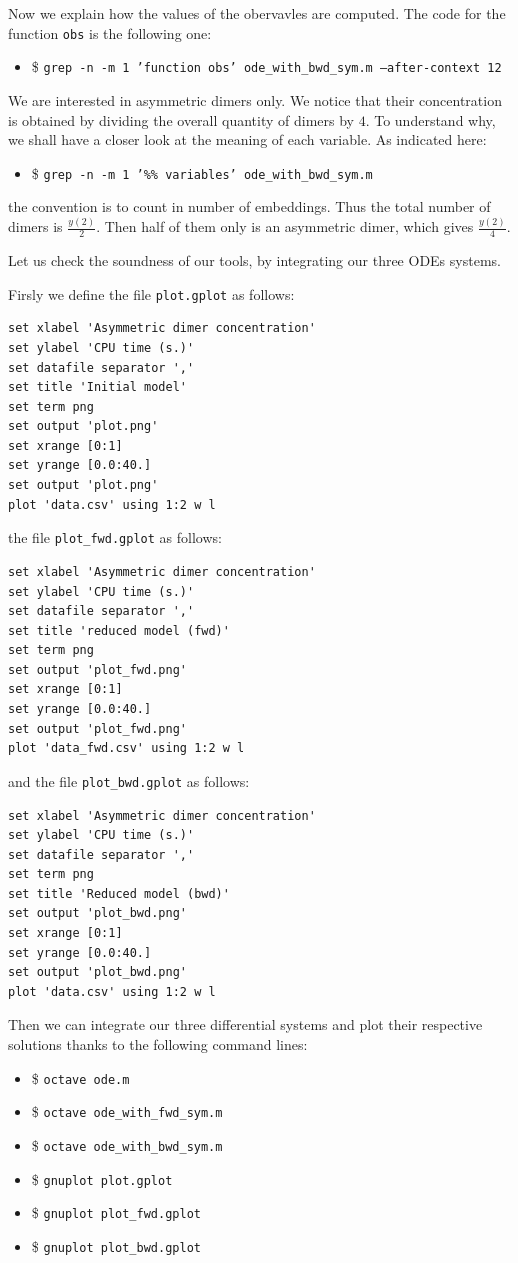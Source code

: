 \documentclass[11pt]{book}
\def\ttt#1{\texttt{#1}}
\def\ITE#1{\begin{itemize}#1\end{itemize}}
\begin{document}
Now we explain how the values of the obervavles are computed.
The code for the function \texttt{obs} is the following one:
\ITE{
\item[\$] \ttt{grep -n -m 1 'function obs' ode\_with\_bwd\_sym.m --after-context 12}}

 We are interested in asymmetric dimers only. We notice that their concentration is obtained by dividing the overall quantity of dimers by $4$. To understand why, we shall have a closer look at the meaning of each variable. As indicated here:
\ITE{
\item[\$] \ttt{grep -n -m 1 '\%\% variables' ode\_with\_bwd\_sym.m}}

the convention is to count in number of embeddings. Thus the total number of dimers is $\frac{y(2)}{2}$. Then half of them only is an asymmetric dimer, which gives $\frac{y(2)}{4}$.

Let us check the soundness of our tools, by integrating our three  ODEs systems.

Firsly we define the file \texttt{plot.gplot} as follows:
\begin{lstlisting}[language=Gnuplot]
set xlabel 'Asymmetric dimer concentration'
set ylabel 'CPU time (s.)'
set datafile separator ','
set title 'Initial model'
set term png
set output 'plot.png'
set xrange [0:1]
set yrange [0.0:40.]
set output 'plot.png'
plot 'data.csv' using 1:2 w l
\end{lstlisting}
the file \texttt{plot\_fwd.gplot} as follows:
\begin{lstlisting}[language=Gnuplot]
set xlabel 'Asymmetric dimer concentration'
set ylabel 'CPU time (s.)'
set datafile separator ','
set title 'reduced model (fwd)'
set term png
set output 'plot_fwd.png'
set xrange [0:1]
set yrange [0.0:40.]
set output 'plot_fwd.png'
plot 'data_fwd.csv' using 1:2 w l
\end{lstlisting}
and the file \texttt{plot\_bwd.gplot} as follows:
\begin{lstlisting}[language=Gnuplot]
set xlabel 'Asymmetric dimer concentration'
set ylabel 'CPU time (s.)'
set datafile separator ','
set term png
set title 'Reduced model (bwd)'
set output 'plot_bwd.png'
set xrange [0:1]
set yrange [0.0:40.]
set output 'plot_bwd.png'
plot 'data.csv' using 1:2 w l
\end{lstlisting}

Then we can integrate our three differential systems and plot their respective  solutions thanks to the following command lines:
\ITE{
\item[\$] \ttt{octave ode.m}
\item[\$] \ttt{octave ode\_with\_fwd\_sym.m}
\item[\$] \ttt{octave ode\_with\_bwd\_sym.m}
\item[\$] \ttt{gnuplot plot.gplot}
\item[\$] \ttt{gnuplot plot\_fwd.gplot}
\item[\$] \ttt{gnuplot plot\_bwd.gplot}}
\end{document}
